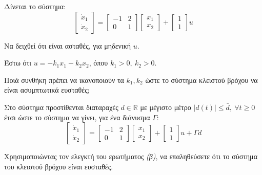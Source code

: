 \documentclass[11pt,a4paper,notitlepage,fleqn]{article}
\begin{document}
\begin{exercise}
	Δίνεται το σύστημα:
	\[
	\left[
	\begin{matrix}
	\dot x_1 \\ \dot x_2
	\end{matrix}
	\right] = \left[\begin{matrix}
	-1 & 2 \\ 0 & 1
	\end{matrix}\right]\left[\begin{matrix}
	x_1 \\ x_2
	\end{matrix}\right] + \left[\begin{matrix}
	1 \\ 1
	\end{matrix}\right]u
	\]

	\begin{enumgreekparen}
		\item Να δειχθεί ότι είναι ασταθές, για μηδενική \( u \).
		\item Έστω ότι \( u=-k_1x_1-k_2x_2 \), όπου \( k_1>0,\ k_2>0 \).

		Ποιά συνθήκη πρέπει να ικανοποιούν τα \( k_1,k_2 \) ώστε το
		σύστημα κλειστού βρόχου να είναι ασυμπτωτικά ευσταθές;
		\item Στο σύστημα προστίθενται διαταραχές
		\( d \in \mathbb R \) με μέγιστο μέτρο
		\( \left|d(t)\right| \leq \bar d ,\ \forall t \geq 0 \) έτσι
		ώστε το σύστημα να γίνει, για ένα διάνυσμα \( \Gamma \):
		\[
		\left[
		\begin{matrix}
		\dot x_1 \\ \dot x_2
		\end{matrix}
		\right] = \left[\begin{matrix}
		-1 & 2 \\ 0 & 1
		\end{matrix}\right]\left[\begin{matrix}
		x_1 \\ x_2
		\end{matrix}\right] + \left[\begin{matrix}
		1 \\ 1
		\end{matrix}\right]u + Γd
		\]

		Χρησιμοποιώντας τον ελεγκτή του ερωτήματος \textit{(β)}, να
		επαληθεύσετε ότι το σύστημα του κλειστού βρόχου είναι ευσταθές.
	\end{enumgreekparen}


\end{exercise}
\end{document}
